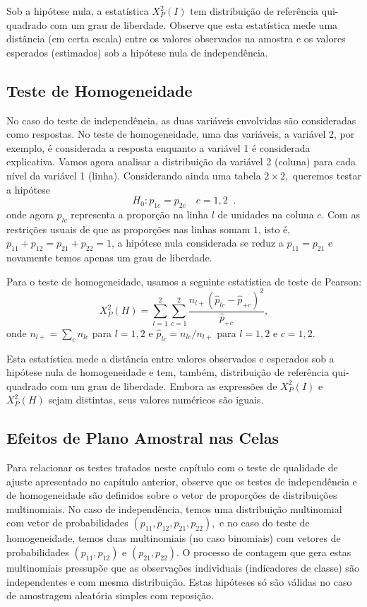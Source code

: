 \documentclass[]{book}
\theoremstyle{definition}
\theoremstyle{definition}
\theoremstyle{definition}
\theoremstyle{remark}
\begin{document}
Sob a hipótese nula, a estatística \(X_{P}^{2}\left( I\right)\) tem
distribuição de referência qui-quadrado com um grau de liberdade.
Observe que esta estatística mede uma distância (em certa escala) entre
os valores observados na amostra e os valores esperados (estimados) sob
a hipótese nula de independência.

\subsection{Teste de Homogeneidade}\label{teste-de-homogeneidade}

No caso do teste de independência, as duas variáveis envolvidas são
consideradas como respostas. No teste de homogeneidade, uma das
variáveis, a variável 2, por exemplo, é considerada a resposta enquanto
a variável 1 é considerada explicativa. Vamos agora analisar a
distribuição da variável 2 (coluna) para cada nível da variável 1
(linha). Considerando ainda uma tabela \(2\times 2,\) queremos testar a
hipótese \[
H_{0}:p_{1c}=p_{2c}\quad c=1,2\;\;. 
\] onde agora \(p_{lc}\) representa a proporção na linha \(l\) de
unidades na coluna \(c\). Com as restrições usuais de que as proporções
nas linhas somam \(1\), isto é, \(p_{11}+p_{12}=p_{21}+p_{22}=1\), a
hipótese nula considerada se reduz a \(p_{11}=p_{21}\) e novamente temos
apenas um grau de liberdade.

Para o teste de homogeneidade, usamos a seguinte estatística de teste de
Pearson: \[
X_{P}^{2}\left( H\right) =\sum\limits_{l=1}^{2}\sum\limits_{c=1}^{2}\frac{
n_{l+}\left( \widehat{p}_{lc}-\hat{p}_{+c}\right) ^{2}}{\hat{p}_{+c}},
\] onde \(n_{l+}=\sum\nolimits_{c}n_{lc}\) para \(l=1,2\) e
\(\widehat{p} _{lc}=n_{lc}/n_{l+}\) para \(l=1,2\) e \(c=1,2\).

Esta estatística mede a distância entre valores observados e esperados
sob a hipótese nula de homogeneidade e tem, também, distribuição de
referência qui-quadrado com um grau de liberdade. Embora as expressões
de \(X_{P}^{2}\left( I\right)\) e \(X_{P}^{2}\left( H\right)\) sejam
distintas, seus valores numéricos são iguais.

\subsection{Efeitos de Plano Amostral nas
Celas}\label{efeitos-de-plano-amostral-nas-celas}

Para relacionar os testes tratados neste capítulo com o teste de
qualidade de ajuste apresentado no capítulo anterior, observe que os
testes de independência e de homogeneidade são definidos sobre o vetor
de proporções de distribuições multinomiais. No caso de independência,
temos uma distribuição multinomial com vetor de probabilidades
\(\left( p_{11},p_{12},p_{21},p_{22}\right) ,\) e no caso do teste de
homogeneidade, temos duas multinomiais (no caso binomiais) com vetores
de probabilidades \(\left( p_{11},p_{12}\right)\) e
\(\left( p_{21},p_{22}\right)\). O processo de contagem que gera estas
multinomiais pressupõe que as observações individuais (indicadores de
classe) são independentes e com mesma distribuição. Estas hipóteses só
são válidas no caso de amostragem aleatória simples com reposição.
\end{document}
